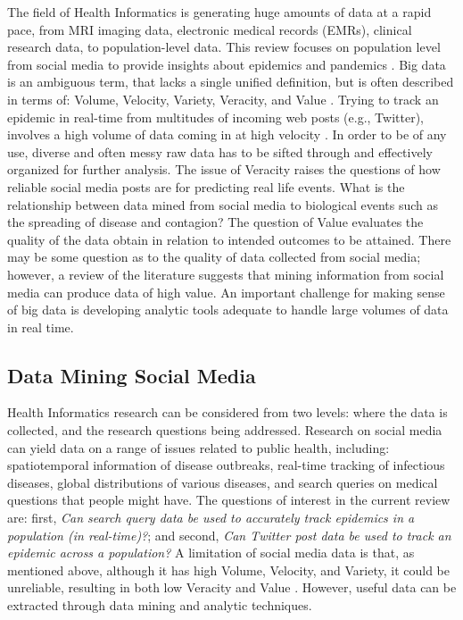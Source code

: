 \documentclass[sigconf]{acmart}
\begin{document}
The field of Health Informatics is generating huge amounts of data at a rapid pace,
from MRI imaging data, electronic medical records (EMRs), clinical research data, to
population-level data. This review focuses on population level from social media to 
provide insights about epidemics and pandemics \cite{hay13, herland14}. Big data is 
an ambiguous term, that lacks a single unified definition, but is often described in 
terms of: Volume, Velocity, Variety, Veracity, and Value \cite{demchenko12}. Trying 
to track an epidemic in real-time from multitudes of incoming web posts (e.g., 
Twitter), involves a high volume of data coming in at high velocity \cite{lamb13, 
paul14}. In order to be of any use, diverse and often messy raw data has to be sifted
through and effectively organized for further analysis. The issue of Veracity raises 
the questions of how reliable social media posts are for predicting real life events.
What is the relationship between data mined from social media to biological events 
such as the spreading of disease and contagion? The question of Value evaluates the 
quality of the data obtain in relation to intended outcomes to be attained. There may
be some question as to the quality of data collected from social media; however, a
review of the literature suggests that mining information from social media can 
produce data of high value. An important challenge for making sense of big data 
is developing analytic tools adequate to handle large volumes of data in real time.

\subsection{Data Mining Social Media}

Health Informatics research can be considered from two levels: where the data 
is collected, and the research questions being addressed. Research on social 
media can yield data on a range of issues related to public health, including: 
spatiotemporal information of disease outbreaks, real-time tracking of infectious
diseases, global distributions of various diseases, and search queries on medical 
questions that people might have. The questions of interest in the current review 
are: first, \textit{Can search query data be used to accurately track epidemics in 
a population (in real-time)?};  and second, \textit{Can Twitter post data be used 
to track an epidemic across a population?} A limitation of social media data is 
that, as mentioned above, although it has high Volume, Velocity, and Variety, it 
could be unreliable, resulting in both low Veracity and Value \cite{hay13, lazer14}. 
However, useful data can be extracted through data mining and analytic techniques. 
\end{document}

